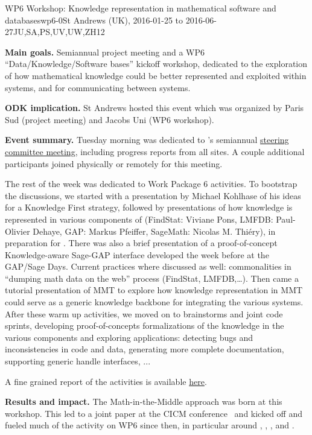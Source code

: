 \begin{event}{WP6 Workshop: Knowledge representation in mathematical software and databases}{wp6-0}{St Andrews (UK), 2016-01-25 to 2016-06-27}{JU,SA,PS,UV,UW,ZH}{12}{}

  \textbf{Main goals.} Semiannual project meeting and a WP6
  ``Data/Knowledge/Software bases'' kickoff workshop, dedicated to the
  exploration of how mathematical knowledge could be better
  represented and exploited within systems, and for communicating
  between systems.


\textbf{ODK implication.} St Andrews hosted this event which was
organized by Paris Sud (project meeting) and Jacobs Uni (WP6 workshop).

\textbf{Event summary.} Tuesday morning was dedicated to \ODK's
semiannual
\href{http://opendreamkit.org/meetings/2016-01-25-DKS/SteeringCommittee/minutes/}
{steering committee meeting}, including progress reports from all
sites. A couple additional \ODK participants joined physically or
remotely for this meeting.

The rest of the week was dedicated to Work Package 6 activities. To
bootstrap the discussions, we started with a presentation by Michael
Kohlhase of his ideas for a Knowledge First strategy, followed by
presentations of how knowledge is represented in various components of
\ODK (FindStat: Viviane Pons, LMFDB: Paul-Olivier Dehaye, GAP: Markus
Pfeiffer, SageMath: Nicolas M. Thiéry), in preparation for
. There was also a brief presentation
of a proof-of-concept Knowledge-aware Sage-GAP interface developed the
week before at the GAP/Sage Days. Current practices where discussed as
well: commonalities in ``dumping math data on the web'' process
(FindStat, LMFDB,…). Then came a tutorial presentation of MMT to
explore how knowledge representation in MMT could serve as a generic
knowledge backbone for integrating the various systems.  After these
warm up activities, we moved on to brainstorms and joint code sprints,
developing proof-of-concepts formalizations of the knowledge in the
various components and exploring applications: detecting bugs and
inconsistencies in code and data, generating more complete
documentation, supporting generic handle interfaces, ...

A fine grained report of the activities is available
\href{http://opendreamkit.org/meetings/2016-01-25-DKS/report/}{here}.

\textbf{Results and impact.} The Math-in-the-Middle approach was born
at this workshop. This led to a joint paper at the CICM
conference~\cite{DehKohKon:iop16} and kicked off and fueled much of
the activity on WP6 since then, in particular around
, ,
, and
.


\end{event}
